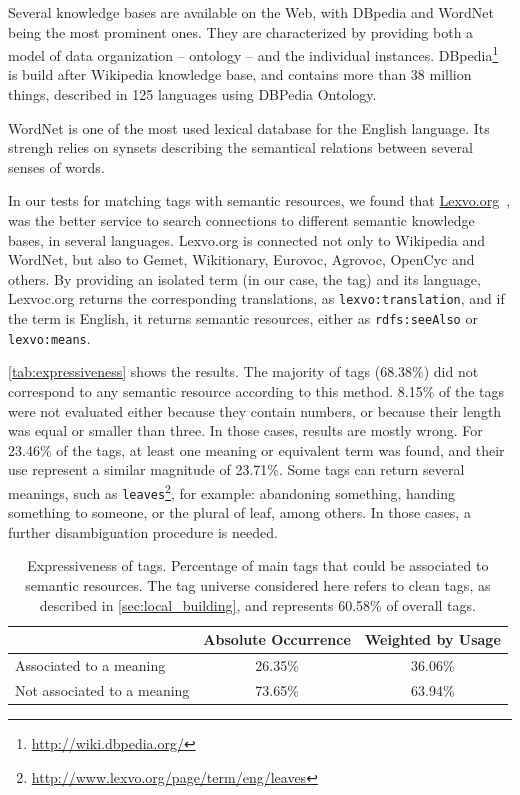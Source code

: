 Several knowledge bases are available on the Web, with DBpedia and WordNet being the most prominent ones.
They are characterized by providing both a model of data organization -- ontology -- and the individual instances.
DBpedia\footnote{\url{http://wiki.dbpedia.org/}} is build after Wikipedia knowledge base, and contains more than 38 million things, described in 125 languages using DBPedia Ontology.

WordNet \cite{Fellbaum1998} is one of the most used lexical database for the English language.
Its strengh relies on synsets describing the semantical relations between several senses of words.

In our tests for matching tags with semantic resources, we found that \url{Lexvo.org}~\cite{Melo2013}, was the better service to search connections to different semantic knowledge bases, in several languages.
Lexvo.org is connected not only to Wikipedia and WordNet, but also to Gemet, Wikitionary, Eurovoc, Agrovoc, OpenCyc and others.
By providing an isolated term (in our case, the tag) and its language, Lexvoc.org returns the corresponding translations, as \texttt{lexvo:translation}, and if the term is English, it returns semantic resources, either as \texttt{rdfs:seeAlso} or \texttt{lexvo:means}.

\autoref{tab:expressiveness} shows the results. 
The majority of tags (68.38\%) did not correspond to any semantic resource according to this method.
8.15\% of the tags were not evaluated either because they contain numbers, or because their length was equal or smaller than three. 
In those cases, results are mostly wrong.
For 23.46\% of the tags, at least one meaning or equivalent term was found, and their use represent a similar magnitude of 23.71\%.
Some tags can return several meanings, such as \texttt{leaves}\footnote{\url{http://www.lexvo.org/page/term/eng/leaves}}, for example: abandoning something, handing something to someone, or the plural of leaf, among others. 
In those cases, a further disambiguation procedure is needed.

\begin{table}[]
\centering
\caption[Expressiveness of tags.]{Expressiveness of tags. Percentage of main tags that could be associated to semantic resources. The tag universe considered here refers to clean tags, as described in \autoref{sec:local_building}, and represents 60.58\% of overall tags.}
\label{tab:expressiveness}
\begin{tabular}{|l|c|c|}
\hline
                            & \textbf{Absolute Occurrence} & \textbf{Weighted by Usage} \\ \hline
Associated to a meaning     & 26.35\%           & 36.06\%                    \\ \hline
Not associated to a meaning & 73.65\%           & 63.94\%                    \\ \hline
\end{tabular}
\end{table}

